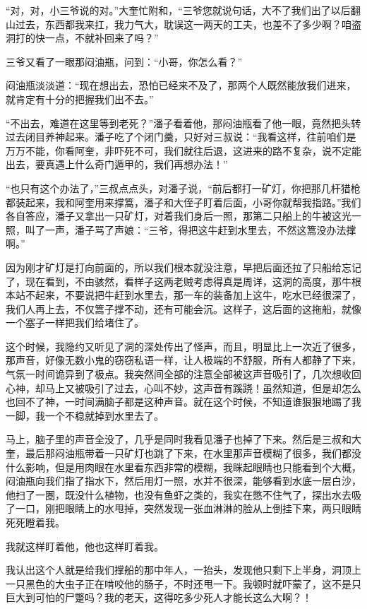 “对，对，小三爷说的对。”大奎忙附和，“三爷您就说句话，大不了我们出了以后翻山过去，东西都我来扛，我力气大，耽误这一两天的工夫，也差不了多少啊？咱盗洞打的快一点，不就补回来了吗？”

三爷又看了一眼那闷油瓶，问到：“小哥，你怎么看？”

闷油瓶淡淡道：“现在想出去，恐怕已经来不及了，那两个人既然能放我们进来，就肯定有十分的把握我们出不去。”

“不出去，难道在这里等到老死？”潘子看着他，那闷油瓶看了他一眼，竟然把头转过去闭目养神起来。潘子吃了个闭门羹，只好对三叔说：“我看这样，往前咱们是万万不能，你看阿奎，非吓死不可，我们就往后退，这进来的路不复杂，说不定能出去，要真遇上什么奇门遁甲的，我们再想办法！”

“也只有这个办法了，”三叔点点头，对潘子说，“前后都打一矿灯，你把那几杆猎枪都装起来，我和阿奎用来撑篙，潘子和大侄子盯着后面，小哥你就帮我指路。”我们各自答应，潘子又拿出一只矿灯，对着我们身后一照，那第二只船上的牛被这光一照，叫了一声，潘子骂了声娘：“三爷，得把这牛赶到水里去，不然这篙没办法撑啊。”

因为刚才矿灯是打向前面的，所以我们根本就没注意，早把后面还拉了只船给忘记了，现在看到，不由骇然，看样子这两老贼考虑得真是周详，这洞的高度，那牛根本站不起来，不要说把牛赶到水里去，那一车的装备加上这牛，吃水已经很深了，我们人再上去，不仅篙子撑不动，还有可能会沉。这样子，这后面的这拖船，就像一个塞子一样把我们给堵住了。

这个时候，我隐约又听见了洞的深处传出了怪声，而且，明显比上一次近了很多，那声音，好像无数小鬼的窃窃私语一样，让人极端的不舒服，所有人都静了下来，气氛一时间诡异到了极点。我突然间全部的注意全部被这声音吸引了，几次想收回心神，却马上又被吸引了过去，心叫不妙，这声音有蹊跷！虽然知道，但是却怎么也回不了神，一时间满脑子都是这种声音。就在这个时候，不知道谁狠狠地踢了我一脚，我一个不稳就掉到水里去了。

马上，脑子里的声音全没了，几乎是同时我看见潘子也掉了下来。然后是三叔和大奎，最后那闷油瓶带着一只矿灯也跳了下来，在水里那声音模糊了很多，我们都没什么影响，但是用肉眼在水里看东西非常的模糊，我眯起眼睛也只能看到个大概，闷油瓶向我们指了指水下，然后用灯一照，水并不很深，能够看到水底一层白沙，他扫了一圈，既没什么植物，也没有鱼虾之类的，我实在憋不住气了，探出水去吸了一口，刚把眼睛上的水甩掉，突然发现一张血淋淋的脸从上倒挂下来，两只眼睛死死瞪着我。

我就这样盯着他，他也这样盯着我。

我认出这个人就是给我们撑船的那中年人，一抬头，发现他只剩下上半身，洞顶上一只黑色的大虫子正在啃咬他的肠子，不时还甩一下。我顿时就吓蒙了，这不是只巨大到可怕的尸蹩吗？我的老天，这得吃多少死人才能长这么大啊？！

